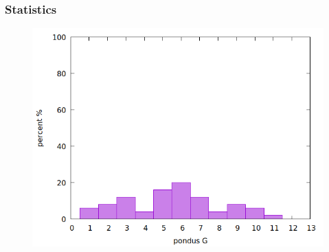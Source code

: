 \documentclass{beamer}
\begin{document}
\begin{frame}
	\frametitle[center]{Statistics}
		\begin{figure}
			\includegraphics[width=.8\textwidth]{../../Data/I-V/I-V_158_2021_02_26/stat.png}
		\end{figure}
\end{frame}
\end{document}
